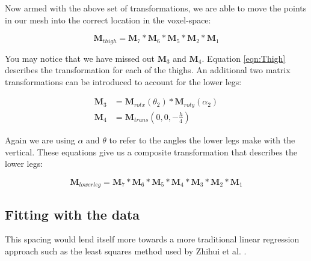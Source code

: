 Now armed with the above set of transformations, we are able to move the points in our mesh into the correct location in the voxel-space:

\begin{equation}
	\label{eqn:Thigh} \mathbf{M}_{thigh} = \mathbf{M}_{7} * \mathbf{M}_{6} * \mathbf{M}_{5} * \mathbf{M}_{2} * \mathbf{M}_{1}
\end{equation}

You may notice that we have missed out $\mathbf{M}_{3}$ and $\mathbf{M}_{4}$.
Equation \ref{eqn:Thigh} describes the transformation for each of the thighs.
An additional two matrix transformations can be introduced to account for the lower legs:

\begin{align}
	\mathbf{M}_{3} &= \mathbf{M}_{rotx}(\theta_{2}) * \mathbf{M}_{roty}(\alpha_{2}) \\
	\mathbf{M}_{4} &= \mathbf{M}_{trans}(0, 0, -\frac{h}{4})
\end{align}

Again we are using $\alpha$ and $\theta$ to refer to the angles the lower legs make with the vertical.
These equations give us a composite transformation that describes the lower legs:

\begin{equation}
	\label{eqn:LowerLegs} \mathbf{M}_{lowerleg} = \mathbf{M}_{7} * \mathbf{M}_{6} * \mathbf{M}_{5} * \mathbf{M}_{4} * \mathbf{M}_{3} * \mathbf{M}_{2} * \mathbf{M}_{1}
\end{equation}



\subsection{Fitting with the data}

This spacing would lend itself more towards a more traditional linear regression approach such as the least squares method used by Zhihui et al. \cite{LinearModelFitting}.

